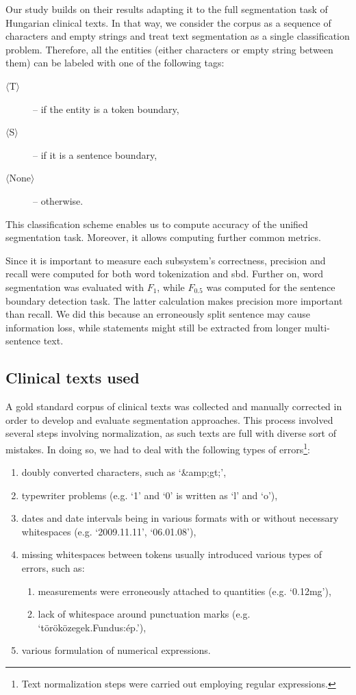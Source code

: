 Our study builds on their results \cite{read2012sentence} adapting it to the full segmentation task of Hungarian clinical texts. 
In that way, we consider the corpus as a sequence of characters and empty strings and treat text segmentation as a single classification problem. 
Therefore, all the entities (either characters or empty string between them) can be labeled with one of the following tags: 
\begin{description}
 \item[$\langle$T$\rangle$] --  if the entity is a token boundary,
 \item[$\langle$S$\rangle$] -- if it is a sentence boundary,
 \item[$\langle$None$\rangle$] -- otherwise.
\end{description}
This classification scheme enables us to compute accuracy of the unified segmentation task. 
Moreover, it allows computing further common metrics.

Since it is important to measure each subsystem's correctness, precision and recall were computed for both word tokenization and \acrshort{sbd}. 
Further on, word segmentation was evaluated with $F_1$, while $F_{0.5}$ was computed for the sentence boundary detection task. 
The latter calculation makes precision more important than recall. %
We did this because an erroneously split sentence may cause information loss\label{sec:loss}, while statements might still be extracted from longer multi-sentence text. 

\subsection{Clinical texts used}
\label{sec:clin_corpus}

A gold standard corpus of clinical texts was collected and manually corrected in order to develop and evaluate segmentation approaches.
This process involved several steps involving normalization, as such texts are full with diverse sort of mistakes. 
In doing so, we had to deal with the following types of errors\footnote{Text normalization steps were carried out employing regular expressions.}:
\begin{enumerate}
 \item doubly converted characters, such as `\&amp;gt;',
 \item typewriter problems (e.g. `1' and `0' is written as `l' and `o'),
 \item dates and date intervals being in various formats with or without necessary whitespaces (e.g. `2009.11.11', `06.01.08'),
 \item missing whitespaces between tokens usually introduced various types of errors, such as:
 \begin{enumerate}
  \item measurements were erroneously attached to quantities (e.g. `0.12mg'),
  \item lack of whitespace around punctuation marks (e.g. `töröközegek.Fundus:ép.'),
 \end{enumerate}
 \item various formulation of numerical expressions.
\end{enumerate}
 
